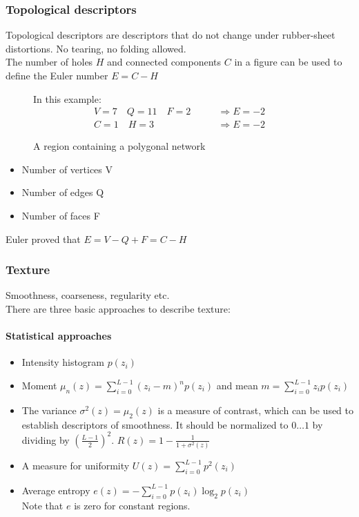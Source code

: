 \subsubsection{Topological descriptors}
Topological descriptors are descriptors that do not change under rubber-sheet distortions. No tearing, no folding allowed.\\
The number of holes $H$ and connected components $C$ in a figure can be used to define the Euler number $E=C-H$\\

\begin{figure}[h]
	\centering
	\caption{A region containing a polygonal network}
	
	In this example: \\
	\begin{align*}
	V=7 \quad Q=11 \quad F=2 \qquad &\Rightarrow E=-2 \\
	C=1 \quad H=3 \qquad &\Rightarrow E=-2
	\end{align*}

\end{figure}

\begin{itemize}
\item Number of vertices V
\item Number of edges Q
\item Number of faces F
\end{itemize}
Euler proved that $E=V-Q+F=C-H$
\subsubsection{Texture}
Smoothness, coarseness, regularity etc.\\
There are three basic approaches to describe texture:\\

\paragraph{Statistical approaches}
\begin{itemize}
\item Intensity histogram $p(z_i)$
\item Moment $\mu_n(z)=\sum\limits_{i=0}^{L-1}(z_i-m)^np(z_i)$ and mean $m=\sum\limits_{i=0}^{L-1}z_ip(z_i)$
\item The variance $\sigma ^2(z) =\mu_2 (z)$ is a measure of contrast, which can be used to establish descriptors of smoothness. It should be normalized to $0 \ldots 1$ by dividing by $\left(\frac{L-1}{2}\right)^2$. $R(z)=1-\frac{1}{1+\sigma ^2(z)}$
\item A measure for uniformity $U(z)=\sum\limits_{i=0}^{L-1}p^2(z_i)$
\item Average entropy $e(z)=-\sum\limits_{i=0}^{L-1}p(z_i)\log_2p(z_i)$ \\ Note that $e$ is zero for constant regions.
\end{itemize}

